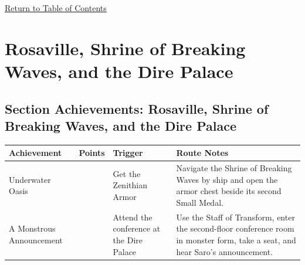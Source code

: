 \documentclass[
  american,
  10pt,
  letterpaper,
  oneside,
  open=any]{scrreprt}
\newcounter{none} %
\newenvironment{guidetable}{%
  \small\setstretch{1.0}%
  \setlength{\tabcolsep}{4pt}%
  \setlength{\LTpre}{8pt}\setlength{\LTpost}{10pt}%
  \renewcommand{\arraystretch}{1.16}%
}{ }
\begin{document}
\hyperref[table-of-contents]{Return to Table of Contents}

\chapter{Rosaville, Shrine of Breaking Waves, and the Dire
Palace}\label{rosaville-shrine-of-breaking-waves-and-the-dire-palace}

\section{Section Achievements: Rosaville, Shrine of Breaking Waves, and
the Dire
Palace}\label{section-achievements-rosaville-shrine-of-breaking-waves-and-the-dire-palace}

\begin{guidetable}

{\def\LTcaptype{none} %
\begin{longtable}[]{@{}
  >{\raggedright\arraybackslash}p{}
  >{\raggedleft\arraybackslash}p{}
  >{\raggedright\arraybackslash}p{}
  >{\raggedright\arraybackslash}p{}@{}}
\toprule\noalign{}
\begin{minipage}[b]{\linewidth}\raggedright
\color{GuideGreen}\bfseries Achievement
\end{minipage} & \begin{minipage}[b]{\linewidth}\raggedleft
\color{GuideGreen}\bfseries Points
\end{minipage} & \begin{minipage}[b]{\linewidth}\raggedright
\color{GuideGreen}\bfseries Trigger
\end{minipage} & \begin{minipage}[b]{\linewidth}\raggedright
\color{GuideGreen}\bfseries Route Notes
\end{minipage} \\
\midrule\noalign{}
\endhead
\bottomrule\noalign{}
\endlastfoot
Underwater Oasis & 5 & Get the Zenithian Armor & Navigate the Shrine of
Breaking Waves by ship and open the armor chest beside its second Small
Medal. \\
A Monstrous Announcement & 5 & Attend the conference at the Dire Palace
& Use the Staff of Transform, enter the second-floor conference room in
monster form, take a seat, and hear Saro's announcement. \\
\end{longtable}
}

\end{guidetable}
\end{document}
